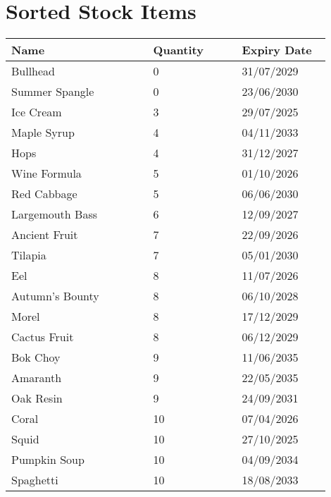 \documentclass{article}
\begin{document}
\section*{Sorted Stock Items}
\begin{longtable}{|p{0.4\linewidth}|p{0.25\linewidth}|p{0.25\linewidth}|}\hline
\textbf{Name} & \textbf{Quantity} & \textbf{Expiry Date}\\
\hline
Bullhead & 0 & 31/07/2029 \\
\hline
Summer Spangle & 0 & 23/06/2030 \\
\hline
Ice Cream & 3 & 29/07/2025 \\
\hline
Maple Syrup & 4 & 04/11/2033 \\
\hline
Hops & 4 & 31/12/2027 \\
\hline
Wine Formula & 5 & 01/10/2026 \\
\hline
Red Cabbage & 5 & 06/06/2030 \\
\hline
Largemouth Bass & 6 & 12/09/2027 \\
\hline
Ancient Fruit & 7 & 22/09/2026 \\
\hline
Tilapia & 7 & 05/01/2030 \\
\hline
Eel & 8 & 11/07/2026 \\
\hline
Autumn's Bounty & 8 & 06/10/2028 \\
\hline
Morel & 8 & 17/12/2029 \\
\hline
Cactus Fruit & 8 & 06/12/2029 \\
\hline
Bok Choy & 9 & 11/06/2035 \\
\hline
Amaranth & 9 & 22/05/2035 \\
\hline
Oak Resin & 9 & 24/09/2031 \\
\hline
Coral & 10 & 07/04/2026 \\
\hline
Squid & 10 & 27/10/2025 \\
\hline
Pumpkin Soup & 10 & 04/09/2034 \\
\hline
Spaghetti & 10 & 18/08/2033 \\
\hline
\end{longtable}
\end{document}
